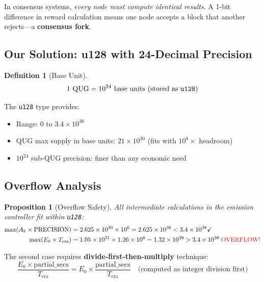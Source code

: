 \documentclass[11pt,a4paper]{article}
\newtheorem{proposition}[theorem]{Proposition}
\newtheorem{definition}[theorem]{Definition}
\begin{document}
In consensus systems, \emph{every node must compute identical results}. A 1-bit difference in reward calculation means one node accepts a block that another rejects---a \textbf{consensus fork}.

\subsection{Our Solution: u128 with 24-Decimal Precision}

\begin{definition}[Base Unit]
\begin{equation}
    1 \text{ QUG} = 10^{24} \text{ base units (stored as \texttt{u128})}
\end{equation}
\end{definition}

The \texttt{u128} type provides:
\begin{itemize}
    \item Range: $0$ to $3.4 \times 10^{38}$
    \item QUG max supply in base units: $21 \times 10^{30}$ (fits with $10^{8}\times$ headroom)
    \item $10^{24}$ sub-QUG precision: finer than any economic need
\end{itemize}

\subsection{Overflow Analysis}

\begin{proposition}[Overflow Safety]
All intermediate calculations in the emission controller fit within \texttt{u128}:
\begin{align}
    \text{max}(A_k \times \text{PRECISION}) &= 2.625 \times 10^{30} \times 10^6 = 2.625 \times 10^{36} < 3.4 \times 10^{38} \checkmark \\
    \text{max}(E_0 \times T_{\text{era}}) &= 1.05 \times 10^{31} \times 1.26 \times 10^8 = 1.32 \times 10^{39} > 3.4 \times 10^{38} \; \text{\color{red}OVERFLOW!}
\end{align}
\end{proposition}

The second case requires \textbf{divide-first-then-multiply} technique:
\begin{equation}
    \frac{E_0 \times \text{partial\_secs}}{T_{\text{era}}} = E_0 \times \frac{\text{partial\_secs}}{T_{\text{era}}} \quad \text{(computed as integer division first)}
\end{equation}
\end{document}

